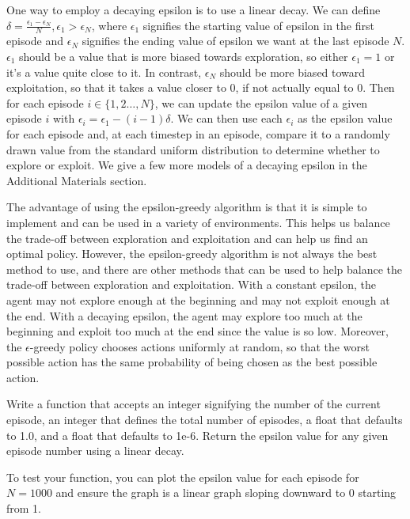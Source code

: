 One way to employ a decaying epsilon is to use a linear decay.
We can define $\delta = \frac{\epsilon_1-\epsilon_{N}}{N}, \epsilon_1>\epsilon_{N}$, where $\epsilon_1$ signifies the starting value of epsilon in the first episode and $\epsilon_{N}$ signifies the ending value of epsilon we want at the last episode $N$.
$\epsilon_1$ should be a value that is more biased towards exploration, so either $\epsilon_1=1$ or it's a value quite close to it.
In contrast, $\epsilon_N$ should be more biased toward exploitation, so that it takes a value closer to 0, if not actually equal to 0.
Then for each episode $i\in\{1,2\ldots, N\}$, we can update the epsilon value of a given episode $i$ with $\epsilon_{i} = \epsilon_{1} - (i-1)\delta$.
We can then use each $\epsilon_i$ as the epsilon value for each episode and, at each timestep in an episode, compare it to a randomly drawn value from the standard uniform distribution to determine whether to explore or exploit.
We give a few more models of a decaying epsilon in the Additional Materials section.

The advantage of using the epsilon-greedy algorithm is that it is simple to implement and can be used in a variety of environments.
This helps us balance the trade-off between exploration and exploitation and can help us find an optimal policy.
However, the epsilon-greedy algorithm is not always the best method to use, and there are other methods that can be used to help balance the trade-off between exploration and exploitation.
With a constant epsilon, the agent may not explore enough at the beginning and may not exploit enough at the end.
With a decaying epsilon, the agent may explore too much at the beginning and exploit too much at the end since the value is so low.
Moreover, the $\epsilon$-greedy policy chooses actions uniformly at random, so that the worst possible action has the same probability of being chosen as the best possible action.

\begin{problem}
    Write a function  that accepts an integer  signifying the number of the current episode, an integer  that defines the total number of episodes, a float  that defaults to 1.0, and a float  that defaults to 1e-6.
    Return the epsilon value for any given episode number using a linear decay.

    To test your function, you can plot the epsilon value for each episode for $N=1000$ and ensure the graph is a linear graph sloping downward to 0 starting from 1.
\end{problem}

